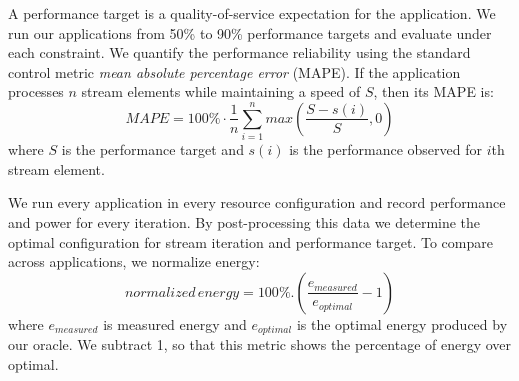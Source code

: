 A performance target is a quality-of-service expectation for the
application. We run our applications from 50\% to 90\% performance
targets and evaluate \SYSTEM{} under each constraint. We quantify the
performance reliability using the standard control metric \emph{mean
  absolute percentage error} (MAPE).  If the application processes $n$
stream elements while maintaining a speed of $S$, then its MAPE is:
\begin{equation}
MAPE = 100\% \cdot \frac{1}{n} \sum\limits_{i=1}^{n} max \left( \frac{S - s(i)}{S},0 \right)
\end{equation}
where $S$ is the performance target and $s(i)$ is the performance
observed for $i$th stream element.


We run every application in every resource configuration and record
performance and power for every iteration.  By post-processing this
data we determine the optimal configuration for stream iteration and
performance target. To compare across applications, we normalize
energy:
\begin{equation}
  normalized\,energy = 100\% . \left( \frac{e_{measured}}{e_{optimal}} - 1 \right)
\end{equation}
where $e_{measured}$ is measured energy and $e_{optimal}$ is the optimal energy
produced by our oracle. We subtract 1, so that this metric shows the
percentage of energy over optimal.  



